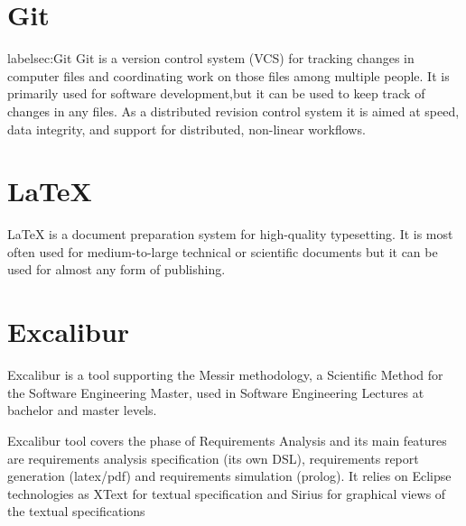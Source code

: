 \section{Git}
label{sec:Git}
Git is a version control system (VCS) for tracking changes in
computer files and coordinating work on those files among multiple people. 
It is primarily used for software development,but it can be used to keep 
track of changes in any files. As a distributed revision control system it 
is aimed at speed, data integrity, and support for distributed, non-linear workflows.

\section{LaTeX}
\label{sec:latex}
LaTeX is a document preparation system for high-quality typesetting. 
It is most often used for medium-to-large technical or scientific documents but it
 can be used for almost any form of publishing.
 
\section{Excalibur}
\label{sec:excalibur}

Excalibur is a tool supporting the Messir methodology, a Scientific Method for the Software 
Engineering Master, used in Software Engineering Lectures at bachelor and master levels.

Excalibur tool covers the phase of Requirements Analysis and its main features are 
requirements analysis specification (its own DSL), requirements report generation 
(latex/pdf) and requirements simulation (prolog). It relies on Eclipse technologies 
as XText for textual specification and Sirius for graphical views of the textual specifications

% 


